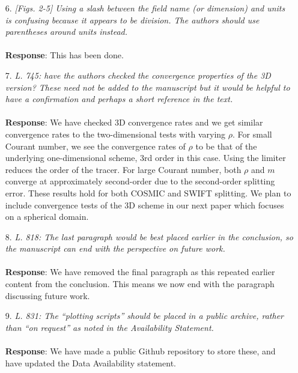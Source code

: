 \documentclass[11pt,a4paper]{article}
\begin{document}
\begin{enumerate}[leftmargin=*]
\item[6.] \textit{[Figs. 2-5] Using a slash between the field name (or dimension) and units is confusing because it appears to be division.  The authors should use parentheses around units instead.} \\
\\
\textbf{Response}: This has been done.

\item[7.] \textit{L. 745: have the authors checked the convergence properties of the 3D version? These need not be added to the manuscript but it would be helpful to have a confirmation and perhaps a short reference in the text. } \\
\\
\textbf{Response}: We have checked 3D convergence rates and we get similar convergence rates to the two-dimensional tests with varying $\rho$. For small Courant number, we see the convergence rates of $\rho$ to be that of the underlying one-dimensional scheme, 3rd order in this case. Using the limiter reduces the order of the tracer. For large Courant number, both $\rho$ and $m$ converge at approximately second-order due to the second-order splitting error. These results hold for both COSMIC and SWIFT splitting. We plan to include convergence tests of the 3D scheme in our next paper which focuses on a spherical domain.

\item[8.] \textit{L. 818: The last paragraph would be best placed earlier in the conclusion, so the manuscript can end with the perspective on future work.} \\
\\
\textbf{Response}: We have removed the final paragraph as this repeated earlier content from the conclusion. This means we now end with the paragraph discussing future work.

\item[9.] \textit{L. 831: The “plotting scripts” should be placed in a public archive, rather than “on request” as noted in the Availability Statement.} \\
\\
\textbf{Response}: We have made a public Github repository to store these, and have updated the Data Availability statement.

\end{enumerate}
\end{document}
